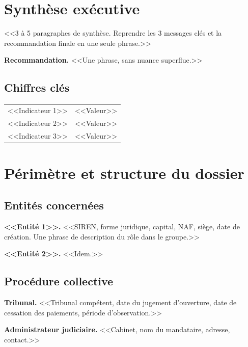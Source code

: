 \documentclass[11pt,a4paper]{article}
\begin{document}
\newpage


\section{Synthèse exécutive}

<<3 à 5 paragraphes de synthèse. Reprendre les 3 messages clés et la
recommandation finale en une seule phrase.>>

\textbf{Recommandation.} <<Une phrase, sans nuance superflue.>>

\subsection{Chiffres clés}

\begin{tabular}{ll}
\toprule
<<Indicateur 1>> & <<Valeur>> \\
<<Indicateur 2>> & <<Valeur>> \\
<<Indicateur 3>> & <<Valeur>> \\
\bottomrule
\end{tabular}

\section{Périmètre et structure du dossier}

\subsection{Entités concernées}

\textbf{<<Entité 1>>.} <<SIREN, forme juridique, capital, NAF, siège, date de
création. Une phrase de description du rôle dans le groupe.>>

\textbf{<<Entité 2>>.} <<Idem.>>

\subsection{Procédure collective}

\textbf{Tribunal.} <<Tribunal compétent, date du jugement d'ouverture, date de
cessation des paiements, période d'observation.>>

\textbf{Administrateur judiciaire.} <<Cabinet, nom du mandataire, adresse, contact.>>
\end{document}
